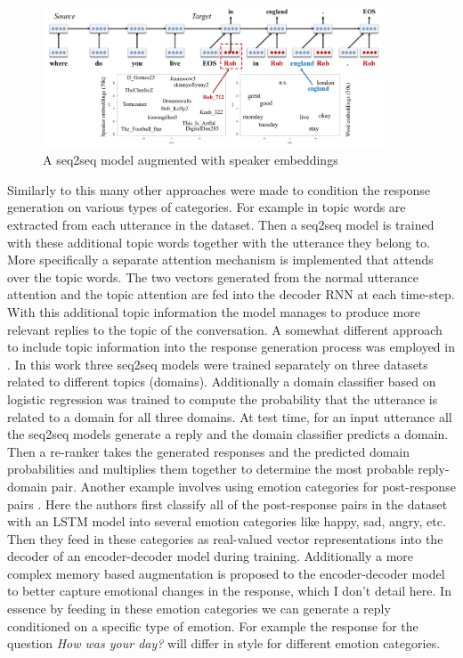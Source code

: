 \documentclass[12pt]{article}
\begin{document}
\begin{figure}[H]
	\label{fig:persona}
	\centering
	\includegraphics[width=0.9\textwidth]{pics/persona.png}
	\caption{A seq2seq model augmented with speaker embeddings \cite{Li:2016}}
\end{figure}

Similarly to this many other approaches were made to condition the response generation on various types of categories. For example in \cite{Xing_topic:2017} topic words are extracted from each utterance in the dataset. Then a seq2seq model is trained with these additional topic words together with the utterance they belong to. More specifically a separate attention mechanism is implemented that attends over the topic words. The two vectors generated from the normal utterance attention and the topic attention are fed into the decoder RNN at each time-step. With this additional topic information the model manages to produce more relevant replies to the topic of the conversation. A somewhat different approach to include topic information into the response generation process was employed in \cite{Choudhary:2017}. In this work three seq2seq models were trained separately on three datasets related to different topics (domains). Additionally a domain classifier based on logistic regression was trained to compute the probability that the utterance is related to a domain for all three domains. At test time, for an input utterance all the seq2seq models generate a reply and the domain classifier predicts a domain. Then a re-ranker takes the generated responses and the predicted domain probabilities and multiplies them together to determine the most probable reply-domain pair. Another example involves using emotion categories for post-response pairs \cite{Zhou:2017}. Here the authors first classify all of the post-response pairs in the dataset with an LSTM model into several emotion categories like happy, sad, angry, etc. Then they feed in these categories as real-valued vector representations into the decoder of an encoder-decoder model during training. Additionally a more complex memory based augmentation is proposed to the encoder-decoder model to better capture emotional changes in the response, which I don't detail here. In essence by feeding in these emotion categories we can generate a reply conditioned on a specific type of emotion. For example the response for the question \textit{How was your day?} will differ in style for different emotion categories.
\end{document}
